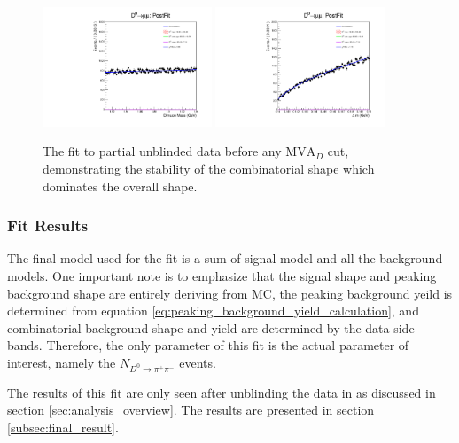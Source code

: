 \begin{figure}[htp]
    \begin{center}
      \includegraphics[width=0.45\textwidth]{figures/chapter4/signal_fit/partial_fit_m.pdf}
      \includegraphics[width=0.45\textwidth]{figures/chapter4/signal_fit/partial_fit_dm.pdf}\\
    \end{center}
    \caption{
      The fit to partial unblinded data before any $\text{MVA}_D$ cut, demonstrating the stability of the combinatorial shape which dominates the overall shape.
    }
    \label{fig:signal_comb_uml_fit}
\end{figure}

\subsubsection{Fit Results}

The final model used for the fit is a sum of signal model and all the background models. One important note is to emphasize that the signal shape and peaking background shape are entirely deriving from MC, the peaking background yeild is determined from equation \ref{eq:peaking_background_yield_calculation}, and combinatorial background shape and yield are determined by the data side-bands. Therefore, the only parameter of this fit is the actual parameter of interest, namely the $N_{D^0 \to \pi^+ \pi^-}$ events. 

The results of this fit are only seen after unblinding the data in as discussed in section \ref{sec:analysis_overview}. The results are presented in section \ref{subsec:final_result}.

